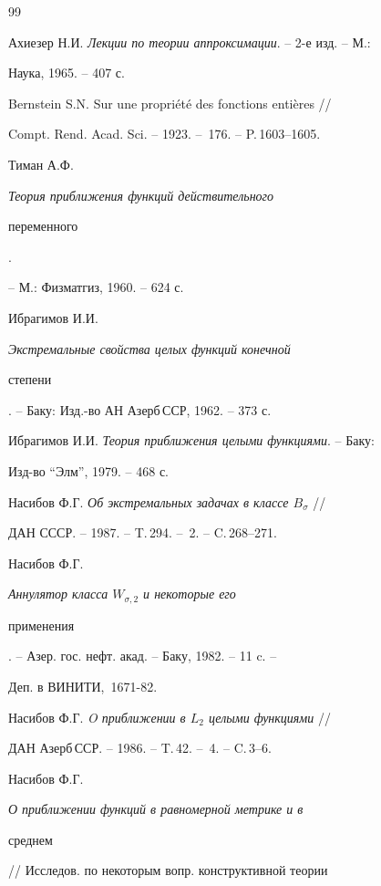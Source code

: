 \begin{thebibliography}{99} 


 




Ахиезер Н.И. {\em Лекции по теории аппроксимации}. -- 2-е изд. -- М.: 


Наука, 1965. -- 407 с. 




Bernstein S.N. Sur une propri\'et\'e des fonctions enti\`eres // 


Compt. Rend. Acad. Sci. -- 1923. -- \No\,176. -- P.\,1603--1605. 




Тиман А.Ф. {\em Теория приближения функций действительного 


переменного}. 


-- М.: Физматгиз, 1960. -- 624 с. 




Ибрагимов И.И. {\em Экстремальные свойства целых функций конечной 


степени}. -- Баку: Изд.-во АН Азерб\,ССР, 1962. -- 373 с. 




Ибрагимов И.И. {\em Теория приближения целыми функциями}. -- Баку: 


Изд-во ``Элм'', 1979. -- 468 с. 




Насибов Ф.Г. {\em Об экстремальных задачах в классе $B_\sigma$} // 


ДАН СССР. -- 1987. -- T.\,294. -- \No\,2. -- C.\,268--271. 




Насибов Ф.Г. {\em Аннулятор класса $W_{\sigma,2}$ и некоторые его 


применения}. -- Азер. гос. нефт. акад. -- Баку, 1982. -- 11 c. --


Деп. в ВИНИТИ, \No\,1671-82. 




Насибов Ф.Г. {\em O приближении в $L_2$ целыми функциями} // 


ДАН Азерб\,ССР. -- 1986. -- T.\,42. -- \No\,4. -- C.\,3--6. 




Насибов Ф.Г. {\em О приближении функций в равномерной метрике и в 


среднем} // Исследов. по некоторым вопр. конструктивной теории 



\end{thebibliography}
